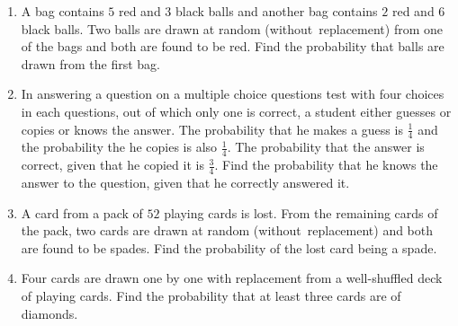 \begin{enumerate}
\item A bag contains $5$ red and $3$ black balls and another bag contains $2$ red and $6$ black balls. Two balls are drawn at random (without~replacement) from one of the bags and both are found to be red. Find the probability that balls are drawn from the first bag.

\item In answering a question on a multiple choice questions test with four choices in each questions, out of which only one is correct, a student either guesses or copies or knows the answer. The probability that he makes a guess is $\frac{1}{4}$ and the probability the he copies is also $\frac{1}{4}$. The probability that the answer is correct, given that he copied it is $\frac{3}{4}$. Find the probability that he knows the answer to the question, given that  he correctly answered it.

\item A card from a pack of $52$ playing cards is lost. From the remaining cards of the pack, two cards are drawn at random (without~replacement) and both are found to be spades. Find the probability of the lost card being a spade.

\item Four cards are drawn one by one with replacement from a well-shuffled deck of playing cards. Find the probability that at least three cards are of diamonds.


\end{enumerate}

